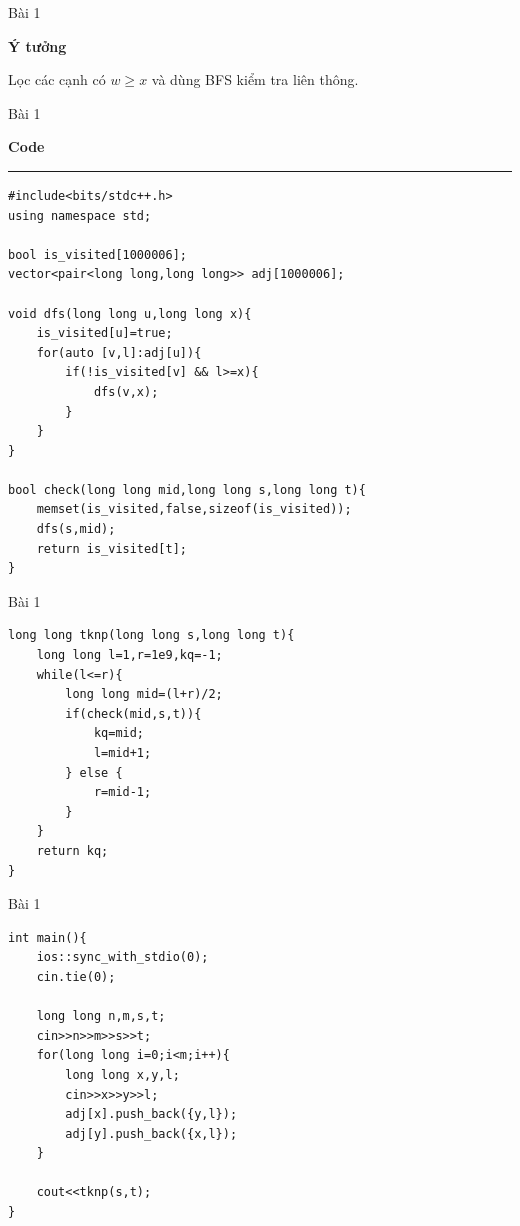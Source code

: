 \begin{frame}{Bài 1}

\textbf{Ý tưởng}

\vspace{0.4cm}

Lọc các cạnh có $w \ge x$ và dùng BFS kiểm tra liên thông.

\end{frame}
\begin{frame}[fragile]{Bài 1}

{\large \color{accent}\textbf{Code}}

\vspace{0.3cm}
\hrule
\vspace{0.4cm}

\begin{lstlisting}
#include<bits/stdc++.h>
using namespace std;

bool is_visited[1000006];
vector<pair<long long,long long>> adj[1000006];

void dfs(long long u,long long x){
    is_visited[u]=true; 
    for(auto [v,l]:adj[u]){ 
        if(!is_visited[v] && l>=x){
            dfs(v,x);
        }
    }
}

bool check(long long mid,long long s,long long t){
    memset(is_visited,false,sizeof(is_visited));
    dfs(s,mid);
    return is_visited[t];
}
\end{lstlisting}
\end{frame}
\begin{frame}[fragile]{Bài 1}
\begin{lstlisting}
long long tknp(long long s,long long t){
    long long l=1,r=1e9,kq=-1;
    while(l<=r){
        long long mid=(l+r)/2;
        if(check(mid,s,t)){
            kq=mid;
            l=mid+1;
        } else {
            r=mid-1;
        }
    }
    return kq;
}

\end{lstlisting}
\end{frame}
\begin{frame}[fragile]{Bài 1}
\begin{lstlisting}
int main(){
    ios::sync_with_stdio(0);
    cin.tie(0);

    long long n,m,s,t;
    cin>>n>>m>>s>>t;
    for(long long i=0;i<m;i++){
        long long x,y,l;
        cin>>x>>y>>l;
        adj[x].push_back({y,l});
        adj[y].push_back({x,l});
    }

    cout<<tknp(s,t);
}
\end{lstlisting}







\end{frame}
